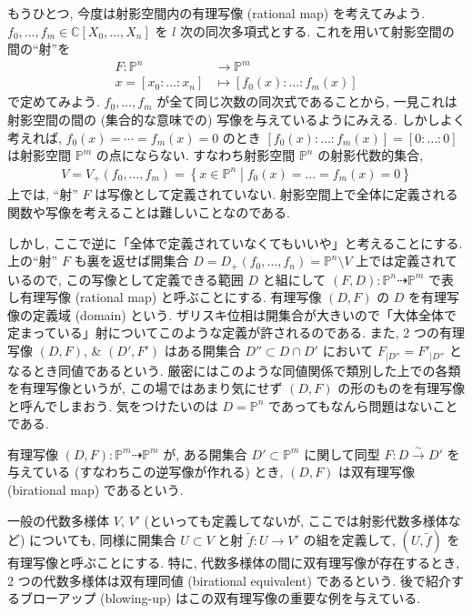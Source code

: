 \documentclass[openany, a4paper, oneside]{jsbook}
\theoremstyle{break}
\theoremstyle{breakdefn}
\newcommand{\relmiddle}[1]{\mathrel{}\middle#1\mathrel{}}
\newcommand{\set}[2]{\left\{#1 \relmiddle| #2\right\}}
\newcommand{\map}{\longrightarrow}
\begin{document}
もうひとつ, 今度は射影空間内の有理写像 (rational map) を考えてみよう.
$f_0,\dots,f_m \in \mathbb{C}[X_0,\dots,X_n]$ を $l$ 次の同次多項式とする.
これを用いて射影空間の間の``射''を
\begin{align}
 F \colon \mathbb{P}^n
 &\map
 \mathbb{P}^m \\
 x = [x_0:\dots:x_n]
 &\longmapsto
 [f_0 (x) : \dots : f_m (x)]
\end{align}
で定めてみよう.
$f_0, \dots, f_m$ が全て同じ次数の同次式であることから,
一見これは射影空間の間の (集合的な意味での) 写像を与えているようにみえる.
しかしよく考えれば, $f_0 (x)=\cdots = f_m (x) = 0$ のとき
$[f_0 (x):\dots:f_m (x)] = [0:\dots:0]$ は射影空間 $\mathbb{P}^m$ の点にならない.
すなわち射影空間 $\mathbb{P}^n$ の射影代数的集合,
\begin{align}
 V
 =
 V_+ (f_0, \dots, f_m)
 =
 \set{x \in \mathbb{P}^n}{f_0 (x)= \dots =f_m (x) = 0}
\end{align}
上では, ``射'' $F$ は写像として定義されていない.
射影空間上で全体に定義される関数や写像を考えることは難しいことなのである.

しかし, ここで逆に「全体で定義されていなくてもいいや」と考えることにする.
上の``射'' $F$ も裏を返せば開集合 $D = D_+ (f_0,\dots,f_n) = \mathbb{P}^n \setminus V$ 上では定義されているので,
この写像として定義できる範囲 $D$ と組にして $(F,D) \colon \mathbb{P}^n \dashrightarrow \mathbb{P}^m$
で表し有理写像 (rational map) と呼ぶことにする.
有理写像 $(D,F)$ の $D$ を有理写像の定義域 (domain) という.
ザリスキ位相は開集合が大きいので「大体全体で定まっている」射についてこのような定義が許されるのである.
また, 2 つの有理写像 $(D,F)$, \& $(D',F')$ はある開集合 $D'' \subset D \cap D'$ において
$F_{|D''} = F'_{|D''}$ となるとき同値であるという.
厳密にはこのような同値関係で類別した上での各類を有理写像というが, この場ではあまり気にせず $(D,F)$ の形のものを有理写像と呼んでしまおう.
気をつけたいのは $D = \mathbb{P}^n$ であってもなんら問題はないことである.

有理写像 $(D,F) \colon \mathbb{P}^m \dashrightarrow \mathbb{P}^m$ が,
ある開集合 $D' \subset \mathbb{P}^m$ に関して同型 $F \colon D \xrightarrow{\sim} D'$ を与えている (すなわちこの逆写像が作れる) とき,
$(D,F)$ は双有理写像 (birational map) であるという.

一般の代数多様体 $V$, $V'$ (といっても定義してないが, ここでは射影代数多様体など) についても,
同様に開集合 $U \subset V$ と射 $\tilde{f} \colon U \to V'$ の組を定義して,
$(U,\tilde{f})$ を有理写像と呼ぶことにする.
特に, 代数多様体の間に双有理写像が存在するとき, 2 つの代数多様体は双有理同値 (birational equivalent) であるという.
後で紹介するブローアップ (blowing-up) はこの双有理写像の重要な例を与えている.
\end{document}
